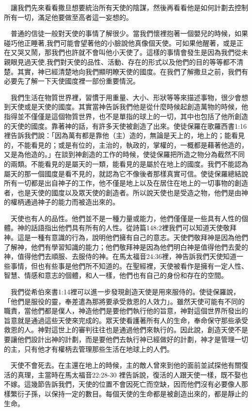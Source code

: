 \documentclass{book}
\begin{document}
　讓我們先來看看撒旦想要統治所有天使的陰謀，然後再看看他是如何計劃去控制所有一切，滿足他要做至高者這一妄想的。

　普通的信徒一般對天使的事情了解很少。當我們懷裡抱著一個嬰兒的時候，如果碰巧他正睡著,我們可能會望著他的小臉說他真像個天使。可如果他醒著，或是正在又哭又鬧，那我們也許就不會叫他小天使了。這樣的事情會發生是因為我們從未親眼見過天使,我們對天使的品性、活動、存在的形式以及他們的目的等等都不清楚。其實，神已經清楚地向我們顯明瞭天使的國度。在我們了解撒旦之前，我們有必要先了解一下天使國度裡一部份重要情況。

　我們生活在物質世界裡，習慣于用重量、大小、形狀等等來描述事物，很少會想到天使或是天使的國度。其實當神告訴我們他是從什麼時候起創造萬物的時候，他指得並不僅僅是這個物質世界，也不是單指的球上的一切，其中也包括了他所創造的天使的國度。靠著神的話，有許多天使被創造了出來。使徒保羅在歌羅西書1:16裡告訴我們說：「因為萬有都是靠他（主）造的，無論是天上的，地上的；能看見的，不能看見的；或是有位的，主治的，執政的，掌權的，一概都是藉著他造的，又是為他造的。」在談到神創造的工作的時候，使徒保羅把所造之物分為截然不同的兩類。不能看見的是屬天的一類，能看見的是屬於在地上的國度。我們不能認為屬天的那一個國度是看不見的，就認為它不像後者那樣真實可信。使徒保羅總結說所有一切都是出自神子的工作，他不僅是地上以及在居住在地上的一切事物的創造者，也是天使的國度以及眾天使的創造者。所以說天使也是受造之物，他們是由神的權柄通過神子的能力而被造出來的。

　天使也有人的品性。他們並不是一種力量或能力，他們僅僅是一些具有人性的個體。神的話語指出他們具有所有的人性。從詩篇148:2裡我們可以知道天使敬拜神。這是一種有意識的行為，說明他們擁有自己的意志。天使們敬拜神是因為他們了解神，他們有學習知識的能力；他們敬拜神是因為他們明白神是值得他們去愛的神，值得他們去順服、去服侍的神。在馬太福音24:36裡，神告訴我們天使知道一些事情，但也有些事是他們所不知道的。在聖經裡，天使被看作是擁有一定人性、智慧、情感和意志的個體，和人一樣，他們也有自己的身份和存在的空間。

　我們從希伯來書1:14裡可以進一步發現創造天使是用來服侍的。使徒保羅說，「他們是服役的靈，奉差遣為那將要承受救恩的人效力」。雖然天使可能有不同的職責，當他們都是僕人，神造他們是要他們執行他的旨意，神對這個世界所發出的旨意就是通過這些天使來完成的。眾天使看護著所有人的生命，奉命保守那些承受救恩的人。神對這世上的審判往往也是通過他們來執行的。因此說，創造天使不是要讓他們設計出神的計劃，而是要他們去執行神已經做好的計劃，神才是管理一切的主，只有他才有權柄去管理那些生活在地球上的人們。

　天使不會死去。在主還在地上的時候，主的敵人曾來到他的面前並試探他有關復活的真理，主當時在馬太福音22:28-30 裡告訴說，復活的人跟天使一樣，既不娶也不嫁。這幾節告訴我們，天使的位置不會因死亡而空缺，因而他們沒有必要像人那樣繁衍子孫，以保持一定的數目。每個天使的生命都是被創造出來的，都是靜止的生命。
\end{document}

